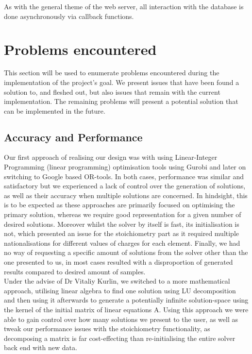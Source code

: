 As with the general theme of the web server, all interaction with the database is done asynchronously via callback functions.

\section{Problems encountered}
This section will be used to enumerate problems encountered during the implementation of the project’s goal. We present issues that have been found a solution to, and fleshed out, but also issues that remain with the current implementation. The remaining problems will present a potential solution that can be implemented in the future.\\

\subsection*{Accuracy and Performance}
Our first approach of realising our design was with using Linear-Integer Programming (linear programming) optimisation tools using Gurobi and later on switching to Google based OR-tools. In both cases, performance was similar and satisfactory but we experienced a lack of control over the generation of solutions, as well as their accuracy when multiple solutions are concerned. In hindsight, this is to be expected as these approaches are primarily focused on optimising the primary solution, whereas we require good representation for a given number of desired solutions. Moreover whilst the solver by itself is fast, its initialisation is not, which presented an issue for the stoichiometry part as it required multiple nationalisations for different values of charges for each element. Finally, we had no way of requesting a specific amount of solutions from the solver other than the one presented to us, in most cases resulted with a disproportion of generated results compared to desired amount of samples. \\

Under the advise of Dr Vitaliy Kurlin, we switched to a more mathematical approach, utilising linear algebra to find one solution using LU decomposition and then using it afterwards to generate a potentially infinite solution-space using the kernel of the initial matrix of linear equations A. Using this approach we were able to gain control over how many solutions we present to the user, as well as tweak our performance issues with the stoichiometry functionality, as decomposing a matrix is far cost-effecting than re-initialising the entire solver back end with new data. \\

